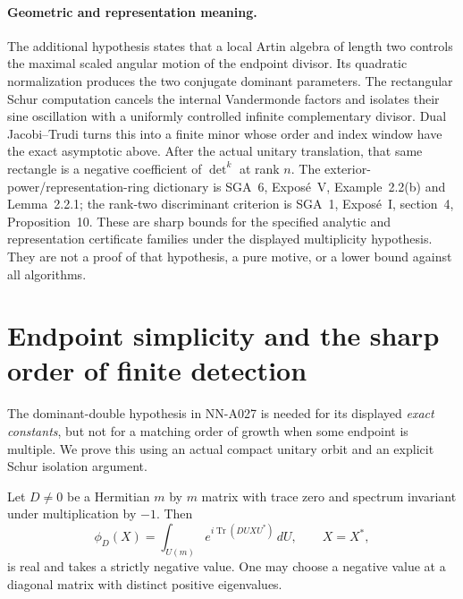 \paragraph{Geometric and representation meaning.}
The additional hypothesis states that a local Artin algebra of length
two controls the maximal scaled angular motion of the endpoint divisor.
Its quadratic normalization produces the two conjugate dominant
parameters. The rectangular Schur computation cancels the internal
Vandermonde factors and isolates their sine oscillation with a uniformly
controlled infinite complementary divisor. Dual Jacobi--Trudi turns
this into a finite minor whose order and index window have the exact
asymptotic above. After the actual unitary translation, that same
rectangle is a negative coefficient of $\det^k$ at rank $n$.
The exterior-power/representation-ring dictionary is SGA~6, Expos\'e~V,
Example~2.2(b) and Lemma~2.2.1; the rank-two discriminant criterion is
SGA~1, Expos\'e~I, section~4, Proposition~10. These are sharp bounds
for the specified analytic and representation certificate families
under the displayed multiplicity hypothesis. They are not a proof
of that hypothesis, a pure motive, or a lower bound against all
algorithms.


\section{Endpoint simplicity and the sharp order of finite detection}
\label{sec:analytic-multiplicity-detection-equivalence}

The dominant-double hypothesis in NN-A027 is needed for its displayed
\emph{exact constants}, but not for a matching order of growth when
some endpoint is multiple. We prove this using an actual compact
unitary orbit and an explicit Schur isolation argument.

\begin{lemma}
\label{lem:analytic-negative-orbital}
Let $D\ne0$ be a Hermitian $m$ by $m$ matrix with trace zero and
spectrum invariant under multiplication by $-1$. Then
\[
 \phi_D(X)=\int_{U(m)}e^{i\operatorname{Tr}(DUXU^*)}\,dU,
                           \qquad X=X^*,
\]
is real and takes a strictly negative value. One may choose a
negative value at a diagonal matrix with distinct positive eigenvalues.
\end{lemma}

